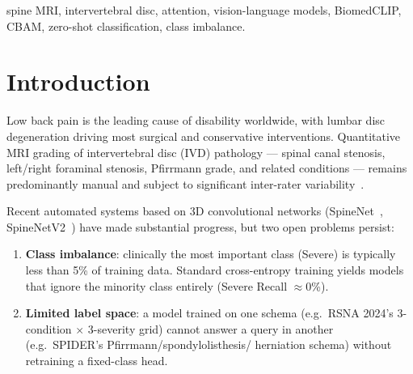 \documentclass[conference]{IEEEtran}
\begin{document}
\begin{IEEEkeywords}
spine MRI, intervertebral disc, attention, vision-language models,
BiomedCLIP, CBAM, zero-shot classification, class imbalance.
\end{IEEEkeywords}

\section{Introduction}
\label{sec:intro}

Low back pain is the leading cause of disability worldwide, with lumbar
disc degeneration driving most surgical and conservative interventions.
Quantitative MRI grading of intervertebral disc (IVD) pathology --- spinal
canal stenosis, left/right foraminal stenosis, Pfirrmann grade, and
related conditions --- remains predominantly manual and subject to
significant inter-rater variability~\cite{hallinan2021,nigru2024}.

Recent automated systems based on 3D convolutional networks
(SpineNet~\cite{jamaludin2017}, SpineNetV2~\cite{windsor2022}) have made
substantial progress, but two open problems persist:
\begin{enumerate}
\item \textbf{Class imbalance}: clinically the most important class
      (Severe) is typically less than 5\% of training data. Standard
      cross-entropy training yields models that ignore the minority
      class entirely (Severe Recall $\approx 0$\%).
\item \textbf{Limited label space}: a model trained on one schema (e.g.\
      RSNA 2024's 3-condition $\times$ 3-severity grid) cannot answer
      a query in another (e.g.\ SPIDER's Pfirrmann/spondylolisthesis/
      herniation schema) without retraining a fixed-class head.
\end{enumerate}
\end{document}
